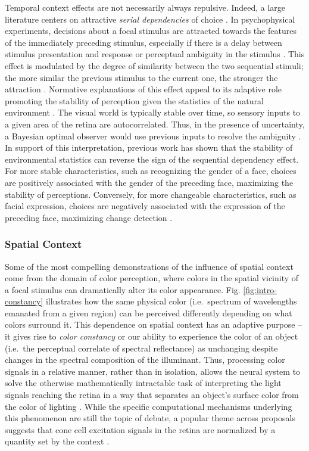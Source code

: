 \documentclass[a4paper, nobind]{templates/ociamthesis}
\begin{document}
Temporal context effects are not necessarily always repulsive. Indeed, a large literature centers on attractive \emph{serial dependencies} of choice \autocite{kiyonaga2017}. In psychophysical experiments, decisions about a focal stimulus are attracted towards the features of the immediately preceding stimulus, especially if there is a delay between stimulus presentation and response or perceptual ambiguity in the stimulus \autocite{akaishi2014}. This effect is modulated by the degree of similarity between the two sequential stimuli; the more similar the previous stimulus to the current one, the stronger the attraction \autocite{fischer2014}. Normative explanations of this effect appeal to its adaptive role promoting the stability of perception given the statistics of the natural environment \autocite{kiyonaga2017}. The visual world is typically stable over time, so sensory inputs to a given area of the retina are autocorrelated. Thus, in the presence of uncertainty, a Bayesian optimal observer would use previous inputs to resolve the ambiguity \autocite{ashourian2011,olkkonen2014a}. In support of this interpretation, previous work has shown that the stability of environmental statistics can reverse the sign of the sequential dependency effect. For more stable characteristics, such as recognizing the gender of a face, choices are positively associated with the gender of the preceding face, maximizing the stability of perceptions. Conversely, for more changeable characteristics, such as facial expression, choices are negatively associated with the expression of the preceding face, maximizing change detection \autocite{taubert2016}.

\hypertarget{spatial-context}{%
\subsubsection{Spatial Context}\label{spatial-context}}

Some of the most compelling demonstrations of the influence of spatial context come from the domain of color perception, where colors in the spatial vicinity of a focal stimulus can dramatically alter its color appearance. Fig. \ref{fig:intro-constancy} illustrates how the same physical color (i.e.~spectrum of wavelengths emanated from a given region) can be perceived differently depending on what colors surround it. This dependence on spatial context has an adaptive purpose -- it gives rise to \emph{color constancy} or our ability to experience the color of an object (i.e.~the perceptual correlate of spectral reflectance) as unchanging despite changes in the spectral composition of the illuminant. Thus, processing color signals in a relative manner, rather than in isolation, allows the neural system to solve the otherwise mathematically intractable task of interpreting the light signals reaching the retina in a way that separates an object's surface color from the color of lighting \autocite{smithson2005}. While the specific computational mechanisms underlying this phenomenon are still the topic of debate, a popular theme across proposals suggests that cone cell excitation signals in the retina are normalized by a quantity set by the context \autocite{land1983,foster2011}.
\end{document}
